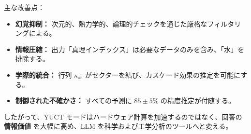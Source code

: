 \documentclass[13pt,a4paper]{ltjsarticle}
\begin{document}
	主な改善点：
	\begin{itemize}
		\item \textbf{幻覚抑制：} 次元的、熱力学的、論理的チェックを通じた厳格なフィルタリングによる。
		\item \textbf{情報圧縮：} 出力「真理インデックス」は必要なデータのみを含み、「水」を排除する。
		\item \textbf{学際的統合：} 行列 \(\kappa_{sr}\) がセクターを結び、カスケード効果の推定を可能にする。
		\item \textbf{制御された不確かさ：} すべての予測に \(85\pm5\%\) の精度推定が付随する。
	\end{itemize}
	
	したがって、YUCT モードはハードウェア計算を加速するのではなく、回答の \textbf{情報価値} を大幅に高め、LLM を科学および工学分析のツールへと変える。
	
\end{document}
